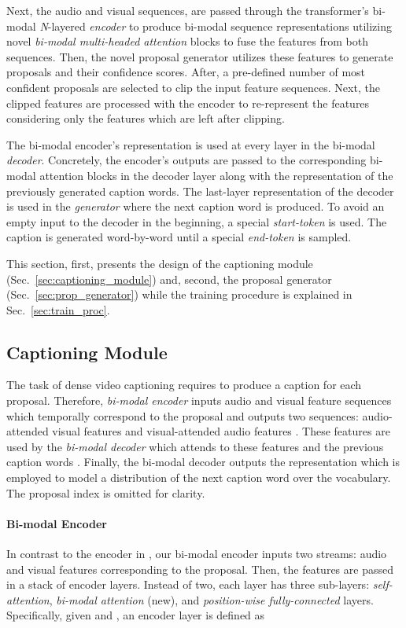 \documentclass{src/bmvc2k}
\begin{document}
Next, the audio and visual sequences, are passed through the transformer's bi-modal \textit{N}-layered \textit{encoder} to produce bi-modal sequence representations utilizing novel \textit{bi-modal multi-headed attention} blocks to fuse the features from both sequences. Then, the novel proposal generator utilizes these features to generate proposals and their confidence scores. After, a pre-defined number of most confident proposals are selected to clip the input feature sequences. Next, the clipped features are processed with the encoder to re-represent the features considering  only the features which are left after clipping.

The bi-modal encoder's representation is used at every layer in the bi-modal \textit{decoder}. Concretely, the encoder's outputs are passed to the corresponding bi-modal attention blocks in the decoder layer along with the representation of the previously generated caption words. The last-layer representation of the decoder is used in the \textit{generator} where the next caption word is produced. To avoid an empty input to the decoder in the beginning, a special \textit{start-token} is used. The caption is generated word-by-word until a special \textit{end-token} is sampled.

This section, first, presents the design of the captioning module (Sec.~\ref{sec:captioning_module}) and, second, the proposal generator (Sec.~\ref{sec:prop_generator}) while the training procedure is explained in Sec.~\ref{sec:train_proc}.

\subsection{Captioning Module\label{sec:captioning_module}}

The task of dense video captioning requires to produce a caption for each proposal. Therefore, \textit{bi-modal encoder} inputs audio  and visual  feature sequences which temporally correspond to the proposal and outputs two sequences: audio-attended visual features  and visual-attended audio features . These features are used by the \textit{bi-modal decoder} which attends to these features and the previous caption words . Finally, the bi-modal decoder outputs the representation which is employed to model a distribution of the next caption word  over the vocabulary. The proposal index is omitted for clarity.

\vspace{-1.4ex}\paragraph{Bi-modal Encoder \label{sec:encoder}}
In contrast to the encoder in \cite{transformer_Vaswani2017}, our bi-modal encoder inputs two streams: audio  and visual  features corresponding to the proposal. Then, the features are passed in a stack of  encoder layers. Instead of two, each layer has three sub-layers: \textit{self-attention}, \textit{bi-modal attention} (new), and \textit{position-wise fully-connected} layers. Specifically, given  and , an  encoder layer is defined as
\end{document}

